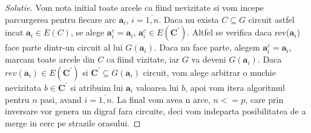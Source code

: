 \documentclass[12pt]{article}
\newenvironment{problema}[2][Problema]{\begin{trivlist}
\item[\hskip \labelsep {\bfseries #1}\hskip \labelsep {\bfseries #2.}]}{\end{trivlist}}
\begin{document}
\begin{proof}[Solutie]
Vom nota initial toate arcele ca fiind nevizitate si vom incepe parcurgerea pentru fiecare arc \(\mathbf{a}_{i}\), \(i=\overline{1, n}\). Daca nu exista \(C\subseteq G\) circuit astfel incat \(\mathbf{a}_{i}\in{E(C)}\), se alege \(\mathbf{a}^{c}_{i}=\mathbf{a}_{i}\), \(\mathbf{a}^{c}_{i}\in{E(\mathbf{C}^{'})}\). Altfel se verifica daca rev(\(\mathbf{a}_{i}\)) face parte dintr-un circuit al lui \(G(\mathbf{a}_{i})\). Daca nu face parte, alegem \(\mathbf{a}^{c}_{i}=\mathbf{a}_{i}\), marcam toate arcele din \(C\) ca fiind vizitate, iar \(G\) va deveni \(G(\mathbf{a}_{i})\). Daca \(rev(\mathbf{a}_{i})\in{E(\mathbf{C}^{'})}\) si \(\mathbf{C}^{'}\subseteq G(\mathbf{a}_{i})\) circuit, vom alege arbitrar o muchie nevizitata \(b\in{\mathbf{C}^{'}}\) si atribuim lui \(\mathbf{a}_{i}\) valoarea lui \(b\), apoi vom itera algoritmul pentru \(n\) pasi, avand \(i=\overline{1, n}\). La final vom avea n arce, \(n<=p\), care prin inversare vor genera un digraf fara circuite, deci vom indeparta posibilitatea de a merge in cerc pe strazile orasului.

\end{proof}

\newpage

\begin{problema}{2}
\end{problema}
 
\end{document}
